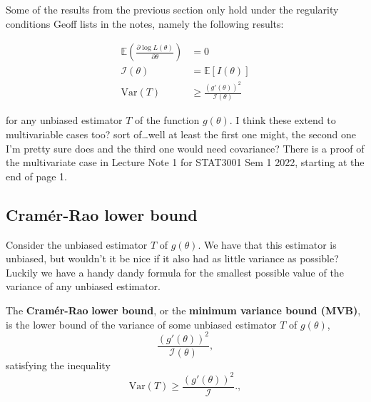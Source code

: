 
Some of the results from the previous section only hold under the regularity conditions Geoff lists in the notes, namely the following results:

\begin{align*}
    \mathbb{E}\left(\frac{\partial \log L(\theta)}{\partial \theta}\right) &= 0\\
    \mathscr{I}(\theta) &= \mathbb{E}[I(\theta)]\\
    \text{Var}(T) &\geq \frac{{(g'(\theta))}^2}{\mathscr{I}(\theta)}
\end{align*}

for any unbiased estimator \(T\) of the function \(g(\theta)\). 
I think these extend to multivariable cases too? sort of\dots well at least the first one might, the second one I'm pretty sure does and the third one would need covariance?
There is a proof of the multivariate case in Lecture Note 1 for STAT3001 Sem 1 2022, starting at the end of page 1.

\subsection{Cram\'{e}r-Rao lower bound}\label{subsec:Cramer-Rao}

Consider the unbiased estimator \(T\) of \(g(\theta)\). 
We have that this estimator is unbiased, but wouldn't it be nice if it also had as little variance as possible?
Luckily we have a handy dandy formula for the smallest possible value of the variance of any unbiased estimator.

\begin{definition}\label{defn:cramer}
    The \textbf{Cram\'{e}r-Rao} \textbf{lower bound}, or the \textbf{minimum variance bound (MVB)}, is the lower bound of the variance of some unbiased estimator \(T\) of \(g(\theta)\), 
    \begin{equation}\label{eq:MVB}
        \frac{{\left(g'(\theta)\right)}^2}{\mathscr{I}(\theta)},
    \end{equation}
    satisfying the inequality 
    \begin{equation}\label{eq:MVB inequality}
        \text{Var}(T) \geq \frac{{\left(g'(\theta)\right)}^2}{\mathscr{I}}.,
    \end{equation}
\end{definition}

